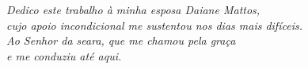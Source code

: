 \newpage


\vfill

\begin{flushright}
    \textit{Dedico este trabalho à minha esposa Daiane Mattos,\\
    cujo apoio incondicional me sustentou nos dias mais difíceis.\\
    Ao Senhor da seara, que me chamou pela graça\\
    e me conduziu até aqui.}
\end{flushright}
